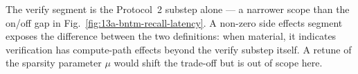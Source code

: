 The \textsf{verify} segment is the Protocol~2 substep alone --- a
narrower scope than the \textsf{on}/\textsf{off} gap in
Fig.~\ref{fig:13a-bntm-recall-latency}. A non-zero \textsf{side
effects} segment exposes the difference between the two definitions:
when material, it indicates verification has compute-path effects
beyond the verify substep itself. A retune of the sparsity parameter
$\mu$ would shift the trade-off but is out of scope here.
